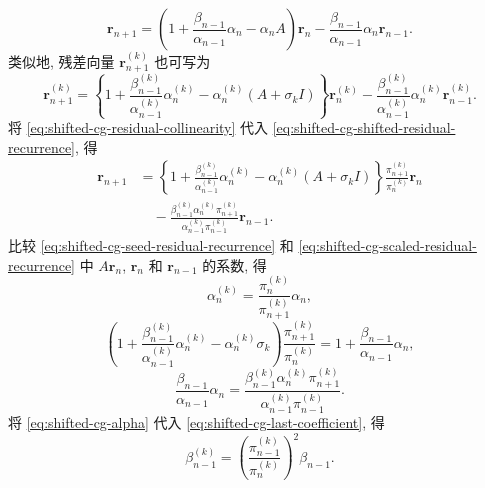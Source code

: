 \begin{equation}\label{eq:shifted-cg-seed-residual-recurrence}\bm r_{n+1}=\left(1+\frac{\beta_{n-1}}{\alpha_{n-1}}\alpha_n-\alpha_nA\right)\bm r_n-\frac{\beta_{n-1}}{\alpha_{n-1}}\alpha_n\bm r_{n-1}.\end{equation}
{类似地, 残差向量 $\bm r_{n+1}^{(k)}$ 也可写为}
\begin{equation}\label{eq:shifted-cg-shifted-residual-recurrence}\bm r_{n+1}^{(k)}=\left\{1+\frac{\beta_{n-1}^{(k)}}{\alpha_{n-1}^{(k)}}\alpha_n^{(k)}-\alpha_n^{(k)}(A+\sigma_k I)\right\}\bm r_n^{(k)}-\frac{\beta_{n-1}^{(k)}}{\alpha_{n-1}^{(k)}}\alpha_n^{(k)}\bm r_{n-1}^{(k)}.\end{equation}
{将 \eqref{eq:shifted-cg-residual-collinearity} 代入 \eqref{eq:shifted-cg-shifted-residual-recurrence}, 得}
\begin{equation}\label{eq:shifted-cg-scaled-residual-recurrence}\begin{aligned}\bm r_{n+1}&=\left\{1+\frac{\beta_{n-1}^{(k)}}{\alpha_{n-1}^{(k)}}\alpha_n^{(k)}-\alpha_n^{(k)}(A+\sigma_k I)\right\}\frac{\pi_{n+1}^{(k)}}{\pi_n^{(k)}}\bm r_n\\&\quad-\frac{\beta_{n-1}^{(k)}\alpha_n^{(k)}\pi_{n+1}^{(k)}}{\alpha_{n-1}^{(k)}\pi_{n-1}^{(k)}}\bm r_{n-1}.\end{aligned}\end{equation}
{比较 \eqref{eq:shifted-cg-seed-residual-recurrence} 和 \eqref{eq:shifted-cg-scaled-residual-recurrence} 中 $A\bm r_n$, $\bm r_n$ 和 $\bm r_{n-1}$ 的系数, 得}
\begin{equation}\label{eq:shifted-cg-alpha}\alpha_n^{(k)}=\frac{\pi_n^{(k)}}{\pi_{n+1}^{(k)}}\alpha_n,\end{equation}
\begin{equation}\label{eq:shifted-cg-middle-coefficient}\left(1+\frac{\beta_{n-1}^{(k)}}{\alpha_{n-1}^{(k)}}\alpha_n^{(k)}-\alpha_n^{(k)}\sigma_k\right)\frac{\pi_{n+1}^{(k)}}{\pi_n^{(k)}}=1+\frac{\beta_{n-1}}{\alpha_{n-1}}\alpha_n,\end{equation}
\begin{equation}\label{eq:shifted-cg-last-coefficient}\frac{\beta_{n-1}}{\alpha_{n-1}}\alpha_n=\frac{\beta_{n-1}^{(k)}\alpha_n^{(k)}\pi_{n+1}^{(k)}}{\alpha_{n-1}^{(k)}\pi_{n-1}^{(k)}}.\end{equation}
{将 \eqref{eq:shifted-cg-alpha} 代入 \eqref{eq:shifted-cg-last-coefficient}, 得}
\begin{equation}\label{eq:shifted-cg-beta}\beta_{n-1}^{(k)}=\left(\frac{\pi_{n-1}^{(k)}}{\pi_n^{(k)}}\right)^2\beta_{n-1}.\end{equation}
